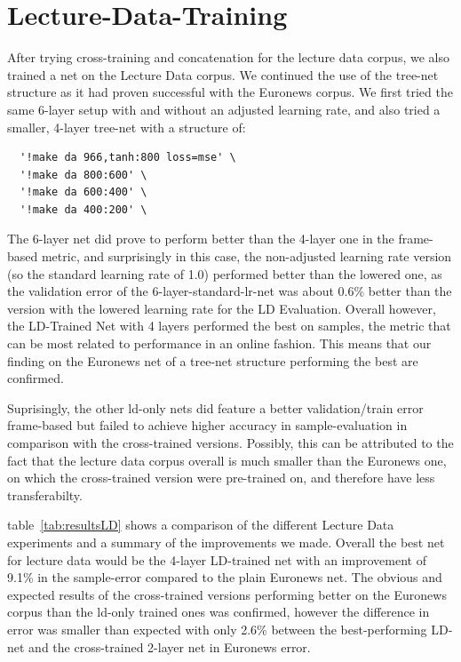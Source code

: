\section{Lecture-Data-Training}
\label{sec:LIDNetworkLDTraining}

After trying cross-training and concatenation for the lecture data corpus, we also trained a net on the Lecture Data corpus. We continued the use of the tree-net structure as it had proven successful with the Euronews corpus.  We first tried the same 6-layer setup with and without an adjusted learning rate, and also tried a smaller, 4-layer tree-net with a structure of:
\begin{verbatim}
  '!make da 966,tanh:800 loss=mse' \
  '!make da 800:600' \
  '!make da 600:400' \
  '!make da 400:200' \
\end{verbatim}

The 6-layer net did prove to perform better than the 4-layer one in the frame-based metric, and surprisingly in this case, the non-adjusted learning rate version (so the standard learning rate of 1.0) performed better than the lowered one, as the validation error of the 6-layer-standard-lr-net was about 0.6\% better than the version with the lowered learning rate for the LD Evaluation.  Overall however, the LD-Trained Net with 4 layers performed the best on samples, the metric that can be most related to performance in an online fashion. This means that our finding on the Euronews net of a tree-net structure performing the best are confirmed.

Suprisingly, the other ld-only nets did feature a better validation/train error frame-based but failed to achieve higher accuracy in sample-evaluation in comparison with the cross-trained versions. Possibly, this can be attributed to the fact that the lecture data corpus overall is much smaller than the Euronews one, on which the cross-trained version were pre-trained on, and therefore have less transferabilty.

table~\ref{tab:resultsLD} shows a comparison of the different Lecture Data experiments and a summary of the improvements we made. Overall the best net for lecture data would be the 4-layer LD-trained net with an improvement of 9.1\% in the sample-error compared to the plain Euronews net. The obvious and expected results of the cross-trained versions performing better on the Euronews corpus than the ld-only trained ones was confirmed, however the difference in error was smaller than expected with only 2.6\% between the best-performing LD-net and the cross-trained 2-layer net in Euronews error.


